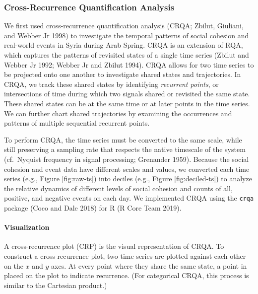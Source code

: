 \documentclass[
  english,
  man]{apa6}
\let\oldparagraph\paragraph
\renewcommand{\paragraph}[1]{\oldparagraph{#1}\mbox{}}
\begin{document}
\hypertarget{cross-recurrence-quantification-analysis}{%
\subsubsection{Cross-Recurrence Quantification Analysis}\label{cross-recurrence-quantification-analysis}}

We first used cross-recurrence quantification analysis (CRQA; Zbilut, Giuliani, and Webber Jr 1998) to investigate the temporal patterns of social cohesion
and real-world events in Syria during Arab Spring. CRQA is an extension of RQA,
which captures the patterns of revisited states of a single time series
(Zbilut and Webber Jr 1992; Webber Jr and Zbilut 1994). CRQA allows for two time series
to be projected onto one another to investigate shared states and trajectories.
In CRQA, we track these shared states by identifying \emph{recurrent points}, or
intersections of time during which two signals shared or revisited the same
state. These shared states can be at the same time or at later points in the
time series. We can further chart shared trajectories by examining the
occurrences and patterns of multiple sequential recurrent points.

To perform CRQA, the time series must be converted to the same scale, while
still preserving a sampling rate that respects the native timescale of the
system (cf.~Nyquist frequency in signal processing; Grenander 1959).
Because the social cohesion and event data have different scales and values, we
converted each time series (e.g., Figure \ref{fig:raw-ts}) into deciles (e.g.,
Figure \ref{fig:deciled-ts}) to analyze the relative dynamics of different
levels of social cohesion and counts of all, positive, and negative events on
each day. We implemented CRQA using the \texttt{crqa} package (Coco and Dale 2018) for R
(R Core Team 2019).

\hypertarget{visualization}{%
\paragraph{Visualization}\label{visualization}}

A cross-recurrence plot (CRP) is the visual representation of CRQA. To construct
a cross-recurrence plot, two time series are plotted against each other on the
\(x\) and \(y\) axes. At every point where they share the same state, a point in
placed on the plot to indicate recurrence. (For categorical CRQA, this process
is similar to the Cartesian product.)
\end{document}
